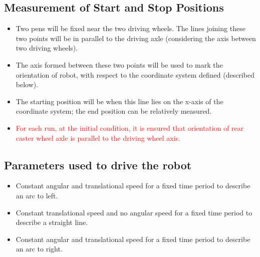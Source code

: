 \documentclass[10pt,a4paper]{article}
\begin{document}
	\subsection{Measurement of Start and Stop Positions}
		\begin{itemize}
			\item Two pens will be fixed near the two driving wheels. The lines joining these two points will be in parallel to the driving axle (considering the axis between two driving wheels).
			\item The axis formed between these two points will be used to mark the orientation of robot, with respect to the coordinate system defined (described below).
			\item The starting position will be when this line lies on the x-axis of the coordinate system; the end position can be relatively measured.
			\item \textcolor{red}{For each run, at the initial condition, it is ensured that orientation of rear caster wheel axle is parallel to the driving wheel axis.}
		\end{itemize}
	\subsection{Parameters used to drive the robot}
		\begin{itemize}
			\item Constant angular and translational speed for a fixed time period to describe an arc to left.
			\item Constant translational speed and no angular speed for a fixed time period to describe a straight line.
			\item Constant angular and translational speed for a fixed time period to describe an arc to right.
		\end{itemize}
\end{document}
